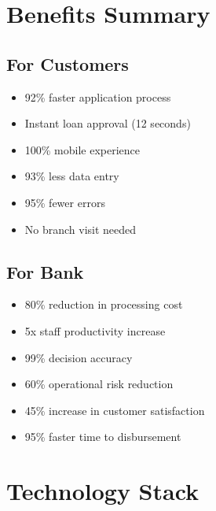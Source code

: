 \documentclass[11pt,a4paper]{article}
\begin{document}
\newpage

\section{Benefits Summary}

\subsection{For Customers}
\begin{itemize}[leftmargin=*]
    \item 92\% faster application process
    \item Instant loan approval (12 seconds)
    \item 100\% mobile experience
    \item 93\% less data entry
    \item 95\% fewer errors
    \item No branch visit needed
\end{itemize}

\subsection{For Bank}
\begin{itemize}[leftmargin=*]
    \item 80\% reduction in processing cost
    \item 5x staff productivity increase
    \item 99\% decision accuracy
    \item 60\% operational risk reduction
    \item 45\% increase in customer satisfaction
    \item 95\% faster time to disbursement
\end{itemize}

\section{Technology Stack}
\end{document}
